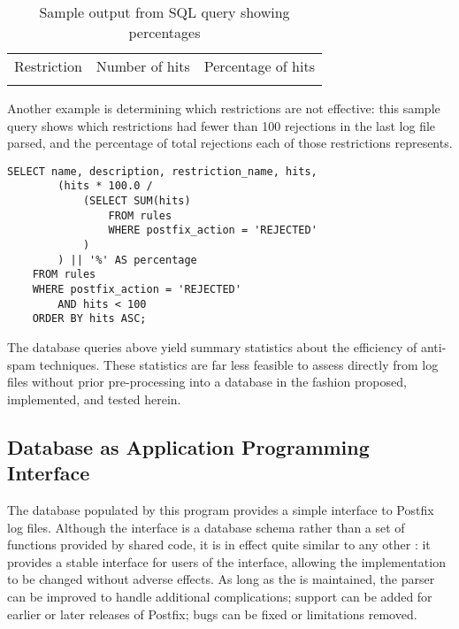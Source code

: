 

\begin{table}[ht]
    \caption{Sample output from SQL query showing percentages}
    \empty{}\label{Sample output from SQL query showing
    percentages}
    \begin{tabular}[]{lrr}
        \tableline{}
        Restriction & Number of hits & Percentage of hits \\
        \tableline{}%
        
        \tableline{}
    \end{tabular}
\end{table}


Another example is determining which restrictions are not effective: this
sample query shows which restrictions had fewer than 100 rejections in the
last log file parsed, and the percentage of total rejections each of those
restrictions represents.

\begin{verbatim}
SELECT name, description, restriction_name, hits,
        (hits * 100.0 /
            (SELECT SUM(hits)
                FROM rules
                WHERE postfix_action = 'REJECTED'
            )
        ) || '%' AS percentage
    FROM rules
    WHERE postfix_action = 'REJECTED'
        AND hits < 100
    ORDER BY hits ASC;
\end{verbatim}

The database queries above yield summary statistics about the efficiency of
anti-spam techniques.  These statistics are far less feasible to assess
directly from log files without prior pre-processing into a database in the
fashion proposed, implemented, and tested herein.

\subsection{Database as Application Programming Interface}

\label{database as API}

The database populated by this program provides a simple interface to
Postfix log files.  Although the interface is a database schema rather than
a set of functions provided by shared code, it is in effect quite similar
to any other \API{}: it provides a stable interface for users of the
interface, allowing the implementation to be changed without adverse
effects.  As long as the \API{} is maintained, the parser can be improved
to handle additional complications; support can be added for earlier or
later releases of Postfix; bugs can be fixed or limitations removed.

